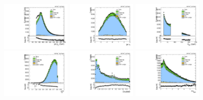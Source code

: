 \begin{figure}[htbp]
  \centering
  \includegraphics[width=0.3\textwidth]{fig/controlPlots/SB_b1_allL_allP_allC_allD_Run2_lnujj_l2_pt.pdf}
  \includegraphics[width=0.3\textwidth]{fig/controlPlots/SB_b1_allL_allP_allC_allD_Run2_lnujj_l2_eta.pdf}
  \includegraphics[width=0.3\textwidth]{fig/controlPlots/SB_b1_allL_allP_allC_allD_Run2_mjet.pdf}\\
  \includegraphics[width=0.3\textwidth]{fig/controlPlots/SB_b1_allL_allP_allC_allD_Run2_tau21DDT.pdf}
  \includegraphics[width=0.3\textwidth]{fig/controlPlots/SB_b1_allL_allP_allC_allD_Run2_DoubleB.pdf}
  \includegraphics[width=0.3\textwidth]{fig/controlPlots/SB_b1_allL_allP_allC_allD_Run2_lnujj_vbfDEta.pdf}\\

\end{figure}
